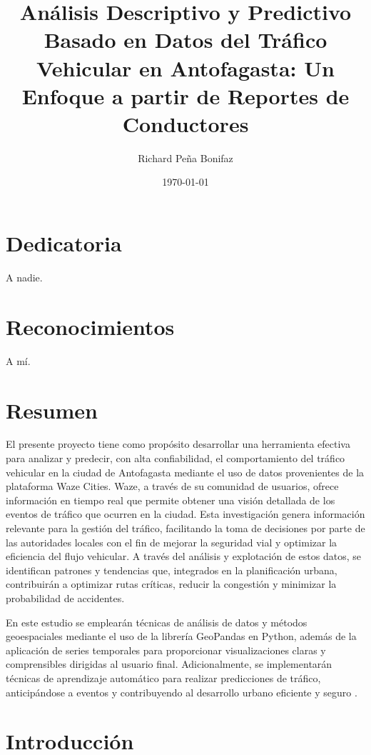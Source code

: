 \documentclass[12pt]{article}
\begin{document}
\title{Análisis Descriptivo y Predictivo Basado en Datos del Tráfico Vehicular en Antofagasta: Un Enfoque a partir de Reportes de Conductores}
\author{Richard Peña Bonifaz}
\date{\today}
\maketitle

\section*{Dedicatoria}
A nadie.
\section*{Reconocimientos}
A mí.

\section*{Resumen}

El presente proyecto tiene como propósito desarrollar una herramienta efectiva para analizar y predecir, con alta confiabilidad, el comportamiento del tráfico vehicular en la ciudad de Antofagasta mediante el uso de datos provenientes de la plataforma Waze Cities. Waze, a través de su comunidad de usuarios, ofrece información en tiempo real que permite obtener una visión detallada de los eventos de tráfico que ocurren en la ciudad. Esta investigación genera información relevante para la gestión del tráfico, facilitando la toma de decisiones por parte de las autoridades locales con el fin de mejorar la seguridad vial y optimizar la eficiencia del flujo vehicular. A través del análisis y explotación de estos datos, se identifican patrones y tendencias que, integrados en la planificación urbana, contribuirán a optimizar rutas críticas, reducir la congestión y minimizar la probabilidad de accidentes.

En este estudio se emplearán técnicas de análisis de datos y métodos geoespaciales mediante el uso de la librería GeoPandas en Python, además de la aplicación de series temporales para proporcionar visualizaciones claras y comprensibles dirigidas al usuario final. Adicionalmente, se implementarán técnicas de aprendizaje automático para realizar predicciones de tráfico, anticipándose a eventos y contribuyendo al desarrollo urbano eficiente y seguro \parencite{barcelo2005}.

\section{Introducción}
\end{document}
